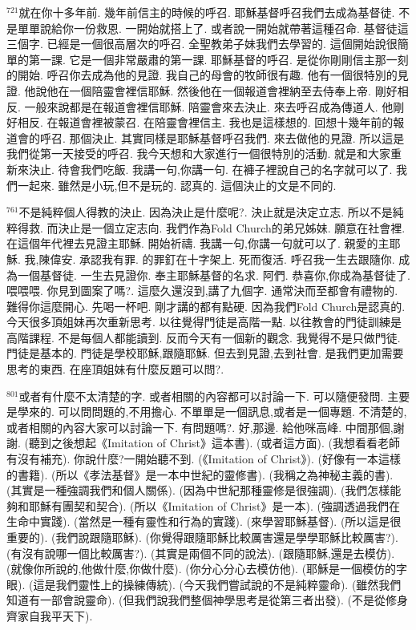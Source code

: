 \documentclass{book}
\begin{document}
$^{721}$就在你十多年前.
幾年前信主的時候的呼召.
耶穌基督呼召我們去成為基督徒.
不是單單說給你一份救恩.
一開始就搭上了.
或者說一開始就帶著這種召命.
基督徒這三個字.
已經是一個很高層次的呼召.
全聖教弟子妹我們去學習的.
這個開始說很簡單的第一課.
它是一個非常嚴肅的第一課.
耶穌基督的呼召.
是從你剛剛信主那一刻的開始.
呼召你去成為他的見證.
我自己的母會的牧師很有趣.
他有一個很特別的見證.
他說他在一個陪靈會裡信耶穌.
然後他在一個報道會裡納至去侍奉上帝.
剛好相反.
一般來說都是在報道會裡信耶穌.
陪靈會來去決止.
來去呼召成為傳道人.
他剛好相反.
在報道會裡被蒙召.
在陪靈會裡信主.
我也是這樣想的.
回想十幾年前的報道會的呼召.
那個決止.
其實同樣是耶穌基督呼召我們.
來去做他的見證.
所以這是我們從第一天接受的呼召.
我今天想和大家進行一個很特別的活動.
就是和大家重新來決止.
待會我們吃飯.
我講一句,你講一句.
在褲子裡說自己的名字就可以了.
我們一起來.
雖然是小玩,但不是玩的.
認真的.
這個決止的文是不同的.

$^{761}$不是純粹個人得教的決止.
因為決止是什麼呢?.
決止就是決定立志.
所以不是純粹得救.
而決止是一個立定志向.
我們作為Fold Church的弟兄姊妹.
願意在社會裡.
在這個年代裡去見證主耶穌.
開始祈禱.
我講一句,你講一句就可以了.
親愛的主耶穌.
我,陳偉安.
承認我有罪.
的罪釘在十字架上.
死而復活.
呼召我一生去跟隨你.
成為一個基督徒.
一生去見證你.
奉主耶穌基督的名求.
阿們.
恭喜你,你成為基督徒了.
喂喂喂.
你見到圖案了嗎?.
這麼久還沒到,講了九個字.
通常決而至都會有禮物的.
難得你這麼開心.
先喝一杯吧.
剛才講的都有點硬.
因為我們Fold Church是認真的.
今天很多頂姐妹再次重新思考.
以往覺得門徒是高階一點.
以往教會的門徒訓練是高階課程.
不是每個人都能讀到.
反而今天有一個新的觀念.
我覺得不是只做門徒.
門徒是基本的.
門徒是學校耶穌,跟隨耶穌.
但去到見證,去到社會.
是我們更加需要思考的東西.
在座頂姐妹有什麼反題可以問?.

$^{801}$或者有什麼不太清楚的字.
或者相關的內容都可以討論一下.
可以隨便發問.
主要是學來的.
可以問問題的,不用擔心.
不單單是一個訊息,或者是一個專題.
不清楚的,或者相關的內容大家可以討論一下.
有問題嗎?.
好,那邊.
給他咪高峰.
中間那個,謝謝.
(聽到之後想起《Imitation of Christ》這本書).
(或者這方面).
(我想看看老師有沒有補充).
你說什麼?一開始聽不到.
(《Imitation of Christ》).
(好像有一本這樣的書籍).
(所以《孝法基督》是一本中世紀的靈修書).
(我稱之為神秘主義的書).
(其實是一種強調我們和個人關係).
(因為中世紀那種靈修是很強調).
(我們怎樣能夠和耶穌有團契和契合).
(所以《Imitation of Christ》是一本).
(強調透過我們在生命中實踐).
(當然是一種有靈性和行為的實踐).
(來學習耶穌基督).
(所以這是很重要的).
(我們說跟隨耶穌).
(你覺得跟隨耶穌比較厲害還是學學耶穌比較厲害?).
(有沒有說哪一個比較厲害?).
(其實是兩個不同的說法).
(跟隨耶穌,還是去模仿).
(就像你所說的,他做什麼,你做什麼).
(你分心分心去模仿他).
(耶穌是一個模仿的字眼).
(這是我們靈性上的操練傳統).
(今天我們嘗試說的不是純粹靈命).
(雖然我們知道有一部會說靈命).
(但我們說我們整個神學思考是從第三者出發).
(不是從修身齊家自我平天下).
\end{document}
